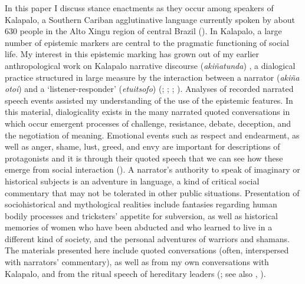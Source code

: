 \documentclass[output=paper]{langsci/langscibook}
\begin{document}
In this paper I discuss stance enactments as they occur among speakers of Kalapalo,  a Southern Cariban agglutinative language currently spoken by about 630 people in the Alto Xingu region of central Brazil (\citealt{Guerreiro2015}). In Kalapalo, a large number of epistemic markers are central to the pragmatic functioning of social life.  My interest in this  epistemic marking has grown out of my earlier anthropological work on Kalapalo narrative discourse (\textit{akiñatunda}) , a dialogical practice structured in large measure by the interaction between a narrator (\textit{akiña otoi})  and a ‘listener-responder’ (\textit{etuitsofo}) (\citealt{Basso1985}; \citeyear{Basso1986}; \citeyear{Basso1987}; \citeyear{Basso1995}). Analyses of recorded narrated speech events assisted my understanding of the use of the epistemic features.  In this material, dialogicality exists in the many narrated quoted conversations in which occur emergent processes of challenge, resistance, debate, deception, and the negotiation of meaning.  Emotional events such as respect and endearment, as well as anger, shame, lust, greed, and envy are important for descriptions of protagonists  and it is through their quoted speech that we can see how these emerge from social interaction (\citealt{Basso2007}).  A narrator’s authority to speak of imaginary or historical subjects is an adventure in language, a kind of critical social commentary that may not be tolerated in other public situations.  Presentation of sociohistorical and mythological realities include fantasies regarding human bodily processes and  tricksters’ appetite for subversion,  as well as historical memories of women who have been abducted and who learned to live in a different kind of society,  and the personal adventures of warriors and shamans.  The materials presented here include quoted conversations (often, interspersed with narrators’ commentary), as well as from my own conversations with Kalapalo, and from the ritual speech of hereditary leaders (\citealt{Basso2009}; see also \citealt{Franchetto1983}, \citeyear{Franchetto2000}).
 
\end{document}
